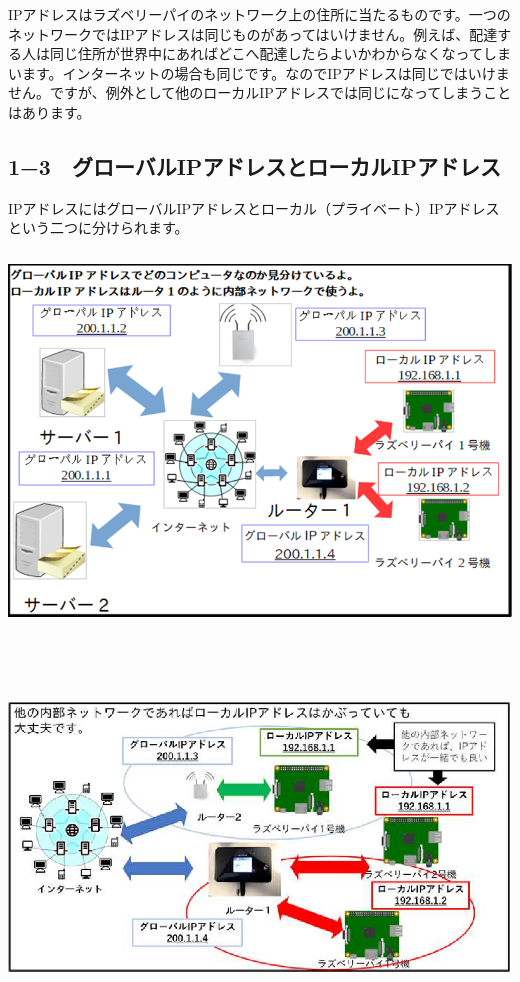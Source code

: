 \documentclass[a4paper,12pt,dvipdfmx]{jarticle}
\begin{document}
\bigskip


\bigskip


\bigskip


\bigskip


\bigskip


\bigskip


\bigskip

IPアドレスはラズベリーパイのネットワーク上の住所に当たるものです。一つのネットワークではIPアドレスは同じものがあってはいけません。例えば、配達する人は同じ住所が世界中にあればどこへ配達したらよいかわからなくなってしまいます。インターネットの場合も同じです。なのでIPアドレスは同じではいけません。ですが、例外として他のローカルIPアドレスでは同じになってしまうことはあります。%

\clearpage\subsection*{\bfseries
	1−3　グローバルIPアドレスとローカルIPアドレス}
IPアドレスにはグローバルIPアドレスとローカル（プライベート）IPアドレスという二つに分けられます。



\centering
\includegraphics[width=15.0cm,height=10.0cm]{ome7-img005.png}

\centering
\includegraphics[width=15.0cm,height=10.0cm]{ome7-img006}
\flushleft
\end{document}
